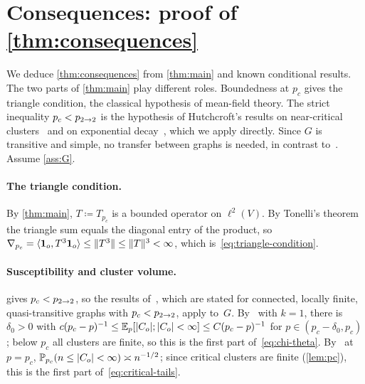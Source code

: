 \section{Consequences: proof of \texorpdfstring{\cref{thm:consequences}}{Theorem 2.3}}\label{sec:consequences}

We deduce \cref{thm:consequences} from \cref{thm:main} and known conditional results. The two parts of
\cref{thm:main} play different roles. Boundedness at $p_c$ gives the triangle condition, the classical
hypothesis of mean-field theory. The strict inequality $p_c<p_{2\to 2}$ is the hypothesis of Hutchcroft's
results on near-critical clusters~\cite{Hut22sup} and on exponential decay~\cite{Hut20L2}, which we
apply directly. Since $G$ is transitive and simple, no transfer between graphs is needed, in contrast
to~\cite{Ope26}. Assume \cref{ass:G}.

\paragraph{The triangle condition.}
By \cref{thm:main}, $T\coloneqq T_{p_c}$ is a bounded operator on $\ell^2(V)$. By Tonelli's theorem the
triangle sum equals the diagonal entry of the product, so
$\nabla_{p_c}=\langle\mathbf{1}_o,T^3\mathbf{1}_o\rangle\le\lVert T^3\rVert\le\lVert T\rVert^3<\infty$,
which is~\eqref{eq:triangle-condition}.

\paragraph{Susceptibility and cluster volume.}
 gives $p_c<p_{2\to 2}$, so the results of~\cite{Hut22sup}, which are stated for connected,
locally finite, quasi-transitive graphs with $p_c<p_{2\to 2}$, apply to~$G$. By~\cite[Corollary~1.4]{Hut22sup}
with $k=1$, there is $\delta_0>0$ with $c(p_c-p)^{-1}\le\mathbb E_p[\lvert C_o\rvert;\lvert C_o\rvert<\infty]\le
C(p_c-p)^{-1}$ for $p\in(p_c-\delta_0,p_c)$; below $p_c$ all clusters are finite, so this is the first
part of~\eqref{eq:chi-theta}. By~\cite[Theorem~1.1]{Hut22sup} at $p=p_c$, $\mathbb P_{p_c}(n\le\lvert C_o\rvert<\infty)
\asymp n^{-1/2}$; since critical clusters are finite (\cref{lem:pc}), this is the first part
of~\eqref{eq:critical-tails}.

